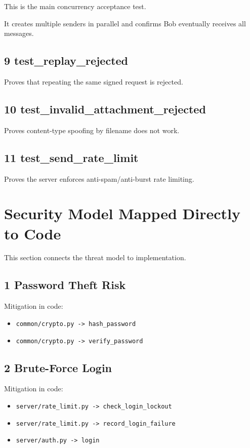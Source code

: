 \documentclass[11pt,a4paper]{article}
\begin{document}
This is the main concurrency acceptance test.

It creates multiple senders in parallel and confirms Bob eventually receives all messages.

\subsection{9 test\_replay\_rejected}

Proves that repeating the same signed request is rejected.

\subsection{10 test\_invalid\_attachment\_rejected}

Proves content-type spoofing by filename does not work.

\subsection{11 test\_send\_rate\_limit}

Proves the server enforces anti-spam/anti-burst rate limiting.


\section{Security Model Mapped Directly to Code}

This section connects the threat model to implementation.

\subsection{1 Password Theft Risk}

Mitigation in code:

\begin{itemize}
\item \nolinkurl{common/crypto.py -> hash_password}
\item \nolinkurl{common/crypto.py -> verify_password}
\end{itemize}

\subsection{2 Brute-Force Login}

Mitigation in code:

\begin{itemize}
\item \nolinkurl{server/rate_limit.py -> check_login_lockout}
\item \nolinkurl{server/rate_limit.py -> record_login_failure}
\item \nolinkurl{server/auth.py -> login}
\end{itemize}
\end{document}
